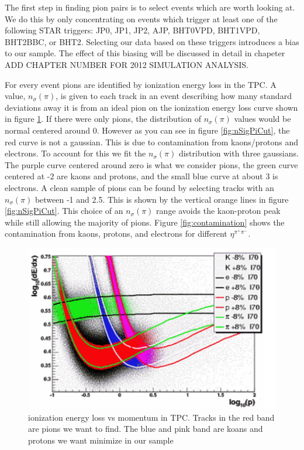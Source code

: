 \documentclass[abstract = on,listof=totoc, bibliography=totoc]{scrreprt}
\begin{document}
The first step in finding pion pairs is to select events which are worth looking at. We do this by only concentrating on events which trigger at least one of the following STAR triggers: JP0, JP1, JP2, AJP, BHT0VPD, BHT1VPD, BHT2BBC, or BHT2. Selecting our data based on these triggers introduces a bias to our sample. The effect of this biasing will be discussed in detail in chapeter ADD CHAPTER NUMBER FOR 2012 SIMULATION ANALYSIS.

For every event pions are identified by ionization energy loss in the TPC. A value, $n_\sigma(\pi)$, is given to each track in an event describing how many standard deviations away it is from an ideal pion on the ionization energy loss curve shown in figure \ref{fig:dedx}. If there were only pions, the distribution of $n_\sigma(\pi)$ values would be normal centered around 0. However as you can see in figure \ref{fig:nSigPiCut}, the red curve is not a gaussian. This is due to contamination from kaons/protons and electrons. To account for this we fit the $n_\sigma(\pi)$ distribution with three gaussians. The purple curve centered around zero is what we consider pions, the green curve centered at -2 are kaons and protons, and the small blue curve at about 3 is electrons. A clean sample of pions can be found by selecting tracks with an $n_\sigma(\pi)$ between -1 and 2.5. This is shown by the vertical orange lines in figure \ref{fig:nSigPiCut}. This choice of an $n_\sigma(\pi)$ range avoids the kaon-proton peak while still allowing the majority of pions. Figure  \ref{fig:contamination} shows the contamination from kaons, protons, and electrons for different $\eta^{\pi^+\pi^-}$.

\begin{figure}
\begin{center}
\includegraphics[width = 1\textwidth]{dedxforPID}
\caption[Ionization energy loss in TPC gas on log scale]{ionization energy loss vs momentum in TPC. Tracks in the red band are pions we want to find. The blue and pink band are koans and protons we want minimize in our sample}
\label{fig:dedx}
\end{center}
\end{figure}
\end{document}
